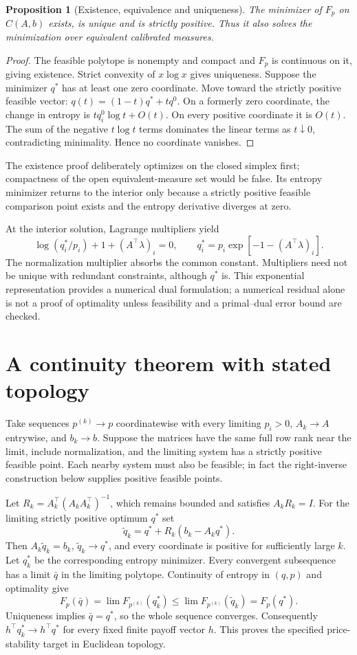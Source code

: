 \documentclass[11pt]{article}
\newtheorem{proposition}{Proposition}
\begin{document}
\begin{proposition}[Existence, equivalence and uniqueness]
The minimizer of $F_p$ on $C(A,b)$ exists, is unique and is strictly positive. Thus it also solves the minimization over equivalent calibrated measures.
\end{proposition}
\begin{proof}
The feasible polytope is nonempty and compact and $F_p$ is continuous on it, giving existence. Strict convexity of $x\log x$ gives uniqueness. Suppose the minimizer $q^*$ has at least one zero coordinate. Move toward the strictly positive feasible vector: $q(t)=(1-t)q^*+tq^0$. On a formerly zero coordinate, the change in entropy is $tq_i^0\log t+O(t)$. On every positive coordinate it is $O(t)$. The sum of the negative $t\log t$ terms dominates the linear terms as $t\downarrow0$, contradicting minimality. Hence no coordinate vanishes.
\end{proof}
The existence proof deliberately optimizes on the closed simplex first; compactness of the open equivalent-measure set would be false. Its entropy minimizer returns to the interior only because a strictly positive feasible comparison point exists and the entropy derivative diverges at zero.

At the interior solution, Lagrange multipliers yield
\[
 \log(q_i^*/p_i)+1+(A^\top\lambda)_i=0,
 \qquad q_i^*=p_i\exp[-1-(A^\top\lambda)_i].
\]
The normalization multiplier absorbs the common constant. Multipliers need not be unique with redundant constraints, although $q^*$ is. This exponential representation provides a numerical dual formulation; a numerical residual alone is not a proof of optimality unless feasibility and a primal--dual error bound are checked.

\section*{A continuity theorem with stated topology}
Take sequences $p^{(k)}\to p$ coordinatewise with every limiting $p_i>0$, $A_k\to A$ entrywise, and $b_k\to b$. Suppose the matrices have the same full row rank near the limit, include normalization, and the limiting system has a strictly positive feasible point. Each nearby system must also be feasible; in fact the right-inverse construction below supplies positive feasible points.

Let $R_k=A_k^\top(A_kA_k^\top)^{-1}$, which remains bounded and satisfies $A_kR_k=I$. For the limiting strictly positive optimum $q^*$ set
\[
 \widetilde q_k=q^*+R_k(b_k-A_kq^*).
\]
Then $A_k\widetilde q_k=b_k$, $\widetilde q_k\to q^*$, and every coordinate is positive for sufficiently large $k$. Let $q_k^*$ be the corresponding entropy minimizer. Every convergent subsequence has a limit $\bar q$ in the limiting polytope. Continuity of entropy in $(q,p)$ and optimality give
\[
 F_p(\bar q)=\lim F_{p^{(k)}}(q_k^*)
 \leq\lim F_{p^{(k)}}(\widetilde q_k)=F_p(q^*).
\]
Uniqueness implies $\bar q=q^*$, so the whole sequence converges. Consequently $h^\top q_k^*\to h^\top q^*$ for every fixed finite payoff vector $h$. This proves the specified price-stability target in Euclidean topology.
\end{document}
